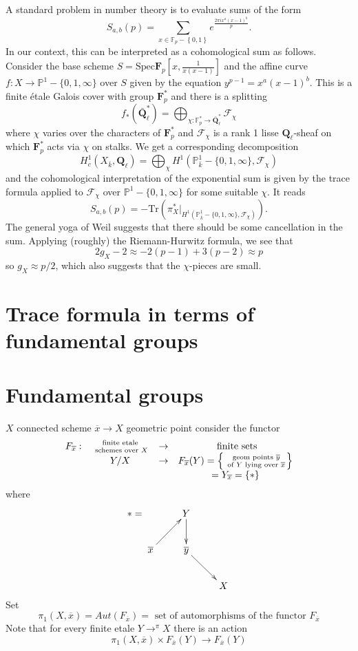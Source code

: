 A standard problem in number theory is to evaluate sums of the form
$$
S_{a,b}(p) = \sum_{x\in \mathbb F_p-\left\{0, 1\right\}} e^{\frac{2\pi 
ix^a(x-1)^b}{p}}.
$$
In our context, this can be interpreted as a cohomological sum as follows. 
Consider the base scheme $S = \text{Spec} \mathbf{F}_p\left[x, 
\frac{1}{x(x-1)}\right]$ and the affine curve $f: X \to \mathbb P^1-\{0, 1, 
\infty\}$ over $S$ given by the equation $y^{p-1} = x^a(x-1)^b$. This is a 
finite \'etale Galois cover with group $\mathbf{F}_p^*$ and there is a splitting
$$
f_*(\bar{\mathbf{Q}}_\ell^*) =
\bigoplus_{\chi : \mathbb F_p^*\to \bar{\mathbf{Q}}_\ell^*} \mathcal{F}_\chi
$$
where $\chi$ varies over the characters of $\mathbf{F}_p^*$ and 
$\mathcal{F}_\chi$ is a rank 1 lisse $\mathbf{Q}_\ell$-sheaf on which 
$\mathbf{F}_p^*$ acts via $\chi$ on stalks. We get a corresponding decomposition
$$
H_c^1(X_{\bar k}, \mathbf{Q}_\ell) = \bigoplus_\chi H^1(\mathbb P_{\bar 
k}^1-\{0, 1, \infty\}, \mathcal{F}_\chi)
$$
and the cohomological interpretation of the exponential sum is given by the 
trace formula applied to $\mathcal{F}_\chi$ over $\mathbb P^1 - \{0, 1, 
\infty\}$ for some suitable $\chi$. It reads
$$
S_{a,b}(p) = -\text{Tr}\left(\pi_X^*\big|_{H^1(\mathbb P_{\bar k}^1-\{0, 1, 
\infty\}, \mathcal{F}_\chi)}\right).
$$
The general yoga of Weil suggests that there should be some cancellation in the 
sum. Applying (roughly) the Riemann-Hurwitz formula, we see that
$$
2g_X-2 \approx -2 (p-1) + 3(p-2) \approx p
$$
so $g_X\approx p/2$, which also suggests that the $\chi$-pieces are small.




\section{Trace formula in terms of fundamental groups}

\section{Fundamental groups} $X$ connected scheme $\overline x\to X$ geometric 
point consider the functor 
$$
\begin{matrix}
F_{\overline x}: &
\text{ finite etale }\atop \text{ schemes over } X &
\to & \text{ finite sets} \\
&
Y/X &
\to &
F_{\overline x}(Y) =
\left\{\text{ geom points }\overline y\atop \text{ of } Y
\text{ lying over }\overline x\right\} \\
&
&
&
= Y_{\overline x} = \left\{ * \right\}
\end{matrix}
$$
where 
$$
* =
\xymatrix{
 &
Y \ar[d] &
\\
\overline x \ar[ur] &
{\overline y} \ar[dr] &
\\
 &
 &
 X
}
$$
Set 
$$
\pi_1(X, \overline x)
=
Aut(F_{\overline x})
=
\text{ set of automorphisms of the functor }F_{\overline x}
$$
	Note that for every finite etale $Y\to^\pi X$ there is an action
		$$\pi_1(X, \overline x) \times F_{\overline x}(Y) \to 
F_{\overline x}(Y)$$
		
